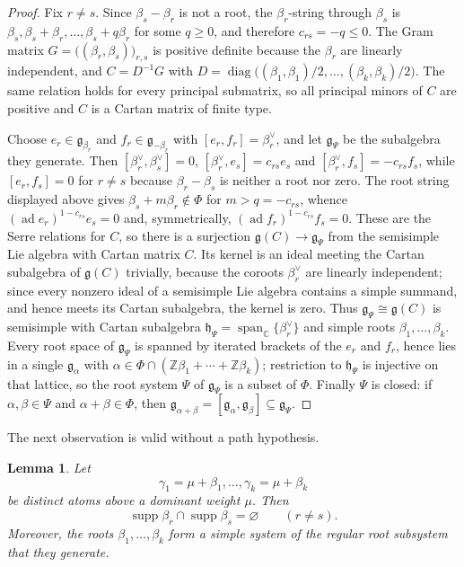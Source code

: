 \documentclass[11pt]{article}
\newtheorem{lemma}[lemma]{Lemma}
\theoremstyle{definition}
\theoremstyle{remark}
\newcommand{\Raiz}{\Phi}
\newcommand{\supp}{\operatorname{supp}}
\newcommand{\Z}{\mathbb Z}
\newcommand{\C}{\mathbb C}
\begin{document}
\begin{proof}
Fix $r\ne s$.  Since $\beta_s-\beta_r$ is not a root, the $\beta_r$-string
through $\beta_s$ is $\beta_s,\beta_s+\beta_r,\ldots,\beta_s+q\beta_r$ for
some $q\ge0$, and therefore $c_{rs}=-q\le0$.  The Gram matrix
$G=\bigl((\beta_r,\beta_s)\bigr)_{r,s}$ is positive definite because the $\beta_r$
are linearly independent, and $C=D^{-1}G$ with
$D=\operatorname{diag}\bigl((\beta_1,\beta_1)/2,\ldots,(\beta_k,\beta_k)/2\bigr)$.  The same relation
holds for every principal submatrix, so all principal minors of $C$ are
positive and $C$ is a Cartan matrix of finite type.

Choose $e_r\in\mathfrak g_{\beta_r}$ and $f_r\in\mathfrak g_{-\beta_r}$ with
$[e_r,f_r]=\beta_r^\vee$, and let $\mathfrak g_\Psi$ be the subalgebra they
generate.  Then $[\beta_r^\vee,\beta_s^\vee]=0$,
$[\beta_r^\vee,e_s]=c_{rs}e_s$ and $[\beta_r^\vee,f_s]=-c_{rs}f_s$, while
$[e_r,f_s]=0$ for $r\ne s$ because $\beta_r-\beta_s$ is neither a root nor
zero.  The root string displayed above gives $\beta_s+m\beta_r\notin\Raiz$ for
$m>q=-c_{rs}$, whence $(\operatorname{ad}e_r)^{1-c_{rs}}e_s=0$ and,
symmetrically, $(\operatorname{ad}f_r)^{1-c_{rs}}f_s=0$.  These are the Serre
relations for $C$, so there is a surjection
$\mathfrak g(C)\to\mathfrak g_\Psi$ from the semisimple Lie algebra with
Cartan matrix $C$.  Its kernel is an ideal meeting the Cartan subalgebra of
$\mathfrak g(C)$ trivially, because the coroots $\beta_r^\vee$ are linearly
independent; since every nonzero ideal of a semisimple Lie algebra contains a
simple summand, and hence meets its Cartan subalgebra, the kernel is zero.
Thus $\mathfrak g_\Psi\cong\mathfrak g(C)$ is semisimple with Cartan
subalgebra $\mathfrak h_\Psi=\operatorname{span}_\C\{\beta_r^\vee\}$ and
simple roots $\beta_1,\ldots,\beta_k$.  Every root space of $\mathfrak g_\Psi$
is spanned by iterated brackets of the $e_r$ and $f_r$, hence lies in a single
$\mathfrak g_\alpha$ with
$\alpha\in\Raiz\cap(\Z\beta_1+\cdots+\Z\beta_k)$; restriction to
$\mathfrak h_\Psi$ is injective on that lattice, so the root system $\Psi$ of
$\mathfrak g_\Psi$ is a subset of $\Raiz$.  Finally $\Psi$ is closed: if
$\alpha,\beta\in\Psi$ and $\alpha+\beta\in\Raiz$, then
$\mathfrak g_{\alpha+\beta}=[\mathfrak g_\alpha,\mathfrak g_\beta]
\subseteq\mathfrak g_\Psi$.
\end{proof}

The next observation is valid without a path hypothesis.

\begin{lemma}\label{lem:atom-disjoint-supports}
Let
\[
   \gamma_1=\mu+\beta_1,\ldots,\gamma_k=\mu+\beta_k
\]
be distinct atoms above a dominant weight $\mu$.  Then
\[
   \supp\beta_r\cap\supp\beta_s=\varnothing
   \qquad(r\ne s).
\]
Moreover, the roots $\beta_1,\ldots,\beta_k$ form a simple system of the
regular root subsystem that they generate.
\end{lemma}
\end{document}
